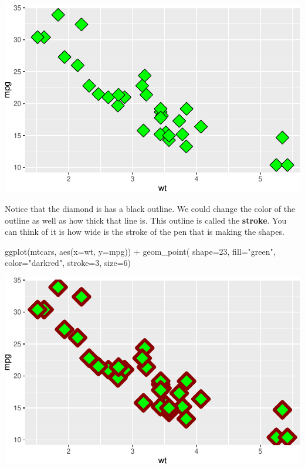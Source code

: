 \documentclass[
  letterpaper,
  DIV=11,
  numbers=noendperiod]{scrreprt}
\newenvironment{Shaded}{\begin{snugshade}}{\end{snugshade}}
\newcommand{\AttributeTok}[1]{\textcolor[rgb]{0.40,0.45,0.13}{#1}}
\newcommand{\DecValTok}[1]{\textcolor[rgb]{0.68,0.00,0.00}{#1}}
\newcommand{\FunctionTok}[1]{\textcolor[rgb]{0.28,0.35,0.67}{#1}}
\newcommand{\NormalTok}[1]{\textcolor[rgb]{0.00,0.23,0.31}{#1}}
\newcommand{\SpecialCharTok}[1]{\textcolor[rgb]{0.37,0.37,0.37}{#1}}
\newcommand{\StringTok}[1]{\textcolor[rgb]{0.13,0.47,0.30}{#1}}
\begin{document}
\includegraphics{Advanced_Scatterplot_Techniques_files/figure-pdf/unnamed-chunk-6-1.pdf}

Notice that the diamond is has a black outline. We could change the
color of the outline as well as how thick that line is. This outline is
called the \textbf{stroke}. You can think of it is how wide is the
stroke of the pen that is making the shapes.

\begin{Shaded}
\begin{Highlighting}[]
\FunctionTok{ggplot}\NormalTok{(mtcars, }\FunctionTok{aes}\NormalTok{(}\AttributeTok{x=}\NormalTok{wt, }\AttributeTok{y=}\NormalTok{mpg)) }\SpecialCharTok{+}
  \FunctionTok{geom\_point}\NormalTok{( }\AttributeTok{shape=}\DecValTok{23}\NormalTok{, }\AttributeTok{fill=}\StringTok{"green"}\NormalTok{, }\AttributeTok{color=}\StringTok{"darkred"}\NormalTok{, }\AttributeTok{stroke=}\DecValTok{3}\NormalTok{, }\AttributeTok{size=}\DecValTok{6}\NormalTok{)}
\end{Highlighting}
\end{Shaded}

\includegraphics{Advanced_Scatterplot_Techniques_files/figure-pdf/unnamed-chunk-7-1.pdf}
\end{document}
